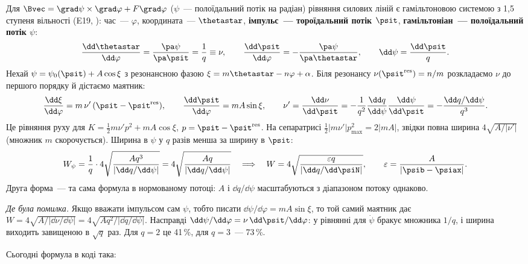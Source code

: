 \begin{derivation}
Для $\Bvec=\grad\psi\times\grad\varphi+F\grad\varphi$ ($\psi$~--- полоїдальний потік на радіан)
рівняння силових ліній є гамільтоновою системою з 1,5 ступеня вільності (E19,
\cite{Escande2024}): час~--- $\varphi$, координата~--- $\thetastar$,
\textbf{імпульс~--- тороїдальний потік $\psit$}, \textbf{гамільтоніан~--- полоїдальний потік $\psi$}:
\begin{equation}\label{eq:g08-ham}
\frac{\dd\thetastar}{\dd\varphi}=\frac{\pa\psi}{\pa\psit}=\frac1q\equiv\nu,\qquad
\frac{\dd\psit}{\dd\varphi}=-\frac{\pa\psi}{\pa\thetastar},\qquad \dd\psi=\frac{\dd\psit}{q}.
\end{equation}
Нехай $\psi=\psi_0(\psit)+A\cos\xi$ з резонансною фазою $\xi=m\thetastar-n\varphi+\alpha$. Біля
резонансу $\nu(\psit^{\text{res}})=n/m$ розкладаємо $\nu$ до першого порядку й дістаємо маятник:
\begin{equation}\label{eq:g08-pend}
\frac{\dd\xi}{\dd\varphi}=m\,\nu'\,(\psit-\psit^{\text{res}}),\qquad
\frac{\dd\psit}{\dd\varphi}=mA\sin\xi,\qquad
\nu'=\frac{\dd\nu}{\dd\psit}=-\frac{1}{q^2}\frac{\dd q}{\dd\psi}\frac{\dd\psi}{\dd\psit}=-\frac{\dd q/\dd\psi}{q^3}.
\end{equation}
Це рівняння руху для $K=\frac12 m\nu' p^2+mA\cos\xi$, $p=\psit-\psit^{\text{res}}$. На
сепаратрисі $\frac12|m\nu'|p_{\max}^2=2|mA|$, звідки повна ширина $4\sqrt{A/|\nu'|}$ (множник $m$
скорочується). Ширина в $\psi$ у $q$ разів менша за ширину в $\psit$:
\begin{equation}\label{eq:g08-W}
W_{\psi}=\frac1q\cdot4\sqrt{\frac{Aq^3}{|\dd q/\dd\psi|}}=4\sqrt{\frac{Aq}{|\dd q/\dd\psi|}}
\quad\Longrightarrow\quad
W=4\sqrt{\frac{\varepsilon q}{|\dd q/\dd\psiN|}},\qquad \varepsilon=\frac{A}{|\psib-\psiax|}.
\end{equation}
Друга форма~--- та сама формула в нормованому потоці: $A$ і $\dd q/\dd\psi$ масштабуються з
діапазоном потоку однаково.

\emph{Де була помилка.} Якщо вважати імпульсом сам $\psi$, тобто писати
$\dd\psi/\dd\varphi=mA\sin\xi$, то той самий маятник дає
$W=4\sqrt{A/|\dd\nu/\dd\psi|}=4\sqrt{Aq^2/|\dd q/\dd\psi|}$. Насправді
$\dd\psi/\dd\varphi=\nu\,\dd\psit/\dd\varphi$: у рівнянні для $\dot\psi$ бракує множника $1/q$, і
ширина виходить завищеною в $\sqrt q$ раз. Для $q=2$ це 41\,\%, для $q=3$~--- 73\,\%.
\end{derivation}

Сьогодні формула в коді така:

